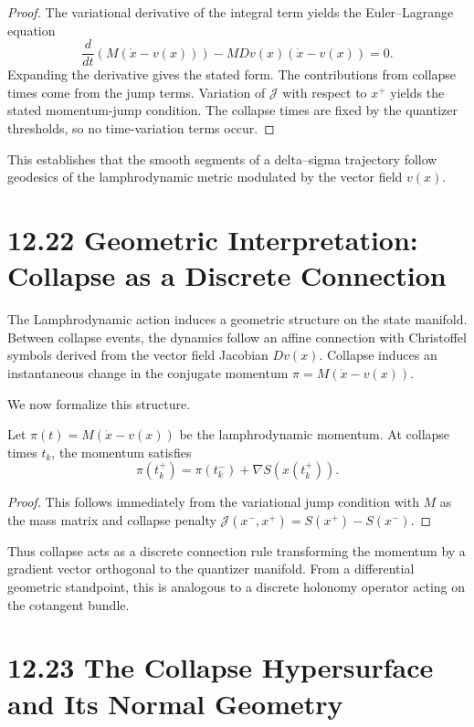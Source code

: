 \begin{proof}
The variational derivative of the integral term yields the Euler--Lagrange equation
\[
\frac{d}{dt}\left( M(\dot{x} - v(x)) \right)
- M Dv(x)(\dot{x} - v(x)) = 0.
\]
Expanding the derivative gives the stated form. The contributions from collapse times come from the jump terms. Variation of $\mathcal{J}$ with respect to $x^{+}$ yields the stated momentum-jump condition. The collapse times are fixed by the quantizer thresholds, so no time-variation terms occur.
\end{proof}

This establishes that the smooth segments of a delta--sigma trajectory follow geodesics of the lamphrodynamic metric modulated by the vector field $v(x)$.

\section*{12.22 Geometric Interpretation: Collapse as a Discrete Connection}

The Lamphrodynamic action induces a geometric structure on the state manifold. Between collapse events, the dynamics follow an affine connection with Christoffel symbols derived from the vector field Jacobian $Dv(x)$. Collapse induces an instantaneous change in the conjugate momentum $\pi = M (\dot{x} - v(x))$.

We now formalize this structure.

\begin{lemma}
Let $\pi(t) = M(\dot{x} - v(x))$ be the lamphrodynamic momentum. At collapse times $t_k$, the momentum satisfies
\[
\pi(t_k^+) = \pi(t_k^-) + \nabla S(x(t_k^+)).
\]
\end{lemma}

\begin{proof}
This follows immediately from the variational jump condition with $M$ as the mass matrix and collapse penalty $\mathcal{J}(x^-,x^+) = S(x^+) - S(x^-)$.
\end{proof}

Thus collapse acts as a discrete connection rule transforming the momentum by a gradient vector orthogonal to the quantizer manifold. From a differential geometric standpoint, this is analogous to a discrete holonomy operator acting on the cotangent bundle.

\section*{12.23 The Collapse Hypersurface and Its Normal Geometry}

